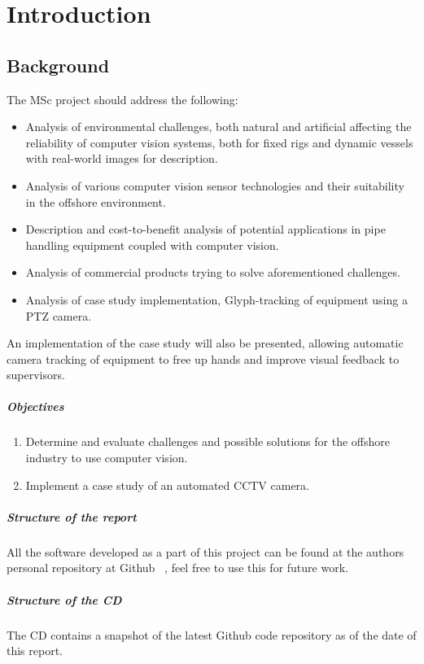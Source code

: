 \chapter{Introduction}
\setcounter{page}{1}
\section{Background}
The MSc project should address the following:
\begin{itemize}
\item Analysis of environmental challenges, both natural and artificial affecting the reliability of computer vision systems, both for fixed rigs and dynamic vessels with real-world images for description.
\item Analysis of various computer vision sensor technologies and their suitability in the offshore environment.
\item Description and cost-to-benefit analysis of potential applications in pipe handling equipment coupled with computer vision.
\item Analysis of commercial products trying to solve aforementioned challenges.
\item Analysis of case study implementation, Glyph-tracking of equipment using a PTZ camera.
\end{itemize}

An implementation of the case study will also be presented, allowing automatic camera tracking of equipment to free up hands and improve visual feedback to supervisors.
\paragraph{Objectives}
\begin{enumerate}
  \item Determine and evaluate challenges and possible solutions for the offshore industry to use computer vision.
  \item Implement a case study of an automated CCTV camera.
\end{enumerate}


\paragraph{Structure of the report}
All the software developed as a part of this project can be found at the authors personal repository at Github ~\cite{Github}, feel free to use this for future work.

\paragraph{Structure of the CD}
The CD contains a snapshot of the latest Github code repository as of the date of this report.